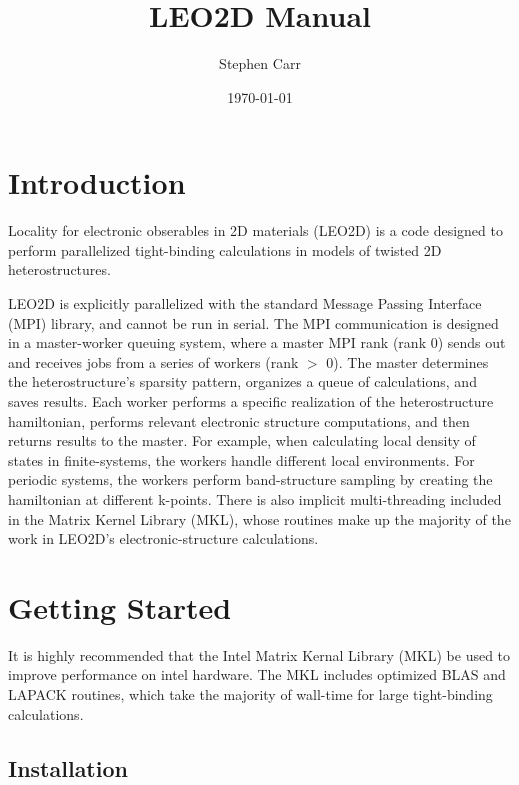 \documentclass[10pt,a4paper]{article}
\begin{document}
\title{LEO2D Manual}
\author{Stephen Carr}
\date{\today}

\maketitle

\tableofcontents

\newpage
{}

\section{Introduction}

Locality for electronic obserables in 2D materials (LEO2D) is a code designed to perform parallelized tight-binding calculations in models of twisted 2D heterostructures.

LEO2D is explicitly parallelized with the standard Message Passing Interface (MPI) library, and cannot be run in serial.
The MPI communication is designed in a master-worker queuing system, where a master MPI rank (rank 0) sends out and receives jobs from a series of workers (rank $>$ 0).
The master determines the heterostructure's sparsity pattern, organizes a queue of calculations, and saves results.
Each worker performs a specific realization of the heterostructure hamiltonian, performs relevant electronic structure computations, and then returns results to the master.
For example, when calculating local density of states in finite-systems, the workers handle different local environments.
For periodic systems, the workers perform band-structure sampling by creating the hamiltonian at different k-points.
There is also implicit multi-threading included in the Matrix Kernel Library (MKL), whose routines make up the majority of the work in LEO2D's electronic-structure calculations.

\section{Getting Started}


It is highly recommended that the Intel Matrix Kernal Library (MKL) be used to improve performance on intel hardware.
The MKL includes optimized BLAS and LAPACK routines, which take the majority of wall-time for large tight-binding calculations.


\subsection{Installation}
\end{document}

